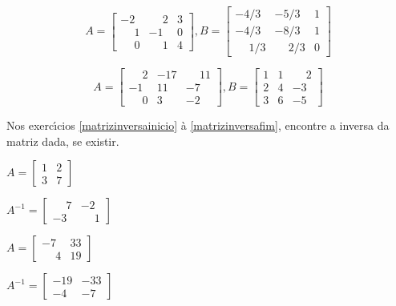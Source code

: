 \documentclass[12pt]{exam}
\begin{document}
\begin{exercicio}
  \[
    A =\begin{bmatrix}
      -2 & \phantom{-} 2 & 3\\
      \phantom{-} 1 & -1 & 0\\
      \phantom{-} 0 & \phantom{-} 1 & 4
    \end{bmatrix}, B =\begin{bmatrix}
      -4/3 & -5/3 & 1\\
      -4/3 & -8/3 & 1\\
      \phantom{-} 1/3 & \phantom{-} 2/3 & 0
    \end{bmatrix}
  \]
\end{exercicio}

\begin{exercicio}\label{matrizfim}
  \[
    A =\begin{bmatrix}
      \phantom{-} 2 & -17 & \phantom{-} 11\\
      -1 & 11 & -7\\
      \phantom{-} 0 & 3 & -2
    \end{bmatrix}, B =\begin{bmatrix}
      1 & 1 & \phantom{-} 2\\
      2 & 4 & -3\\
      3 & 6 & -5
    \end{bmatrix}
  \]
\end{exercicio}

Nos exerc{\'\i}cios \ref{matrizinversainicio} \`a \ref{matrizinversafim}, encontre a inversa da matriz dada, se existir.

\begin{exercicio}\label{matrizinversainicio}
  $
    A =\begin{bmatrix}
        1 & 2\\
        3 & 7
    \end{bmatrix}
  $
  \begin{solucao}
    $A^{-1} =\begin{bmatrix}
      \phantom{-} 7 & -2\\
      -3 & \phantom{-} 1
    \end{bmatrix}$
  \end{solucao}
\end{exercicio}

\begin{exercicio}
  $
    A =\begin{bmatrix}
        -7 & 33\\
        \phantom{-} 4 & 19
    \end{bmatrix}
  $
  \begin{solucao}
    $A^{-1} =\begin{bmatrix}
      -19 & -33\\
      -4 & -7
    \end{bmatrix}$
  \end{solucao}
\end{exercicio}
\end{document}
